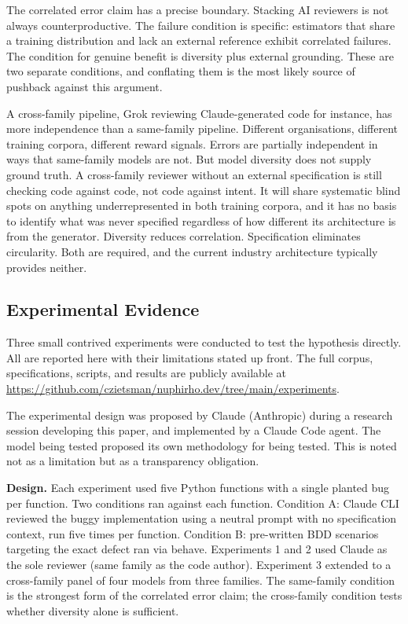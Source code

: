 \documentclass{article}
\begin{document}
The correlated error claim has a precise boundary. Stacking AI reviewers
is not always counterproductive. The failure condition is specific:
estimators that share a training distribution and lack an external
reference exhibit correlated failures. The condition for genuine benefit
is diversity plus external grounding. These are two separate conditions,
and conflating them is the most likely source of pushback against this
argument.

A cross-family pipeline, Grok reviewing Claude-generated code for
instance, has more independence than a same-family pipeline. Different
organisations, different training corpora, different reward signals.
Errors are partially independent in ways that same-family models are
not. But model diversity does not supply ground truth. A cross-family
reviewer without an external specification is still checking code
against code, not code against intent. It will share systematic blind
spots on anything underrepresented in both training corpora, and it has
no basis to identify what was never specified regardless of how different
its architecture is from the generator. Diversity reduces correlation.
Specification eliminates circularity. Both are required, and the current
industry architecture typically provides neither.

\subsection{Experimental Evidence}

Three small contrived experiments were conducted to test the hypothesis
directly. All are reported here with their limitations stated up front.
The full corpus, specifications, scripts, and results are publicly
available at \url{https://github.com/czietsman/nuphirho.dev/tree/main/experiments}.

The experimental design was proposed by Claude (Anthropic) during a
research session developing this paper, and implemented by a Claude Code
agent. The model being tested proposed its own methodology for being
tested. This is noted not as a limitation but as a transparency
obligation.

\textbf{Design.} Each experiment used five Python functions with a single
planted bug per function. Two conditions ran against each function.
Condition A: Claude CLI reviewed the buggy implementation using a neutral
prompt with no specification context, run five times per function.
Condition B: pre-written BDD scenarios targeting the exact defect ran via
behave. Experiments 1 and 2 used Claude as the sole reviewer (same family
as the code author). Experiment 3 extended to a cross-family panel of four
models from three families. The same-family condition is the strongest form
of the correlated error claim; the cross-family condition tests whether
diversity alone is sufficient.
\end{document}
